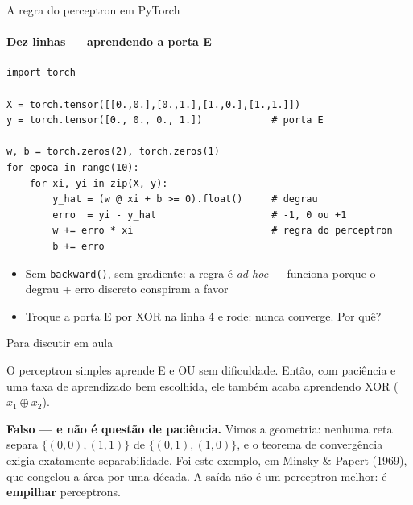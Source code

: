 \documentclass[aspectratio=169, 11pt]{beamer}
\begin{document}
\begin{frame}[fragile]{A regra do perceptron em PyTorch}
  \framesubtitle{Dez linhas — aprendendo a porta E}

\begin{lstlisting}
import torch

X = torch.tensor([[0.,0.],[0.,1.],[1.,0.],[1.,1.]])
y = torch.tensor([0., 0., 0., 1.])            # porta E

w, b = torch.zeros(2), torch.zeros(1)
for epoca in range(10):
    for xi, yi in zip(X, y):
        y_hat = (w @ xi + b >= 0).float()     # degrau
        erro  = yi - y_hat                    # -1, 0 ou +1
        w += erro * xi                        # regra do perceptron
        b += erro
\end{lstlisting}

  \begin{itemize}\setlength{\itemsep}{0.2ex}
    \item Sem \texttt{backward()}, sem gradiente: a regra é \emph{ad hoc} —
          funciona porque o degrau + erro discreto conspiram a favor
    \item Troque a porta E por XOR na linha 4 e rode: \alert{nunca converge}.
          Por quê?
  \end{itemize}
\end{frame}

\begin{frame}{Para discutir em aula}
  \begin{quizbox}
    O perceptron simples aprende E e OU sem dificuldade. Então, com paciência e
    uma taxa de aprendizado bem escolhida, ele também acaba aprendendo XOR
    ($x_1 \oplus x_2$).

    \smallskip
  \end{quizbox}

  \pause

  \begin{respbox}
    \textbf{Falso — e não é questão de paciência.} Vimos a geometria:
    \alert{nenhuma reta} separa $\{(0,0),(1,1)\}$ de $\{(0,1),(1,0)\}$, e o
    teorema de convergência exigia exatamente separabilidade. Foi este
    exemplo, em Minsky \& Papert (1969), que congelou a área por uma década.
    A saída não é um perceptron melhor: é \textbf{empilhar} perceptrons.
  \end{respbox}
\end{frame}
\end{document}
